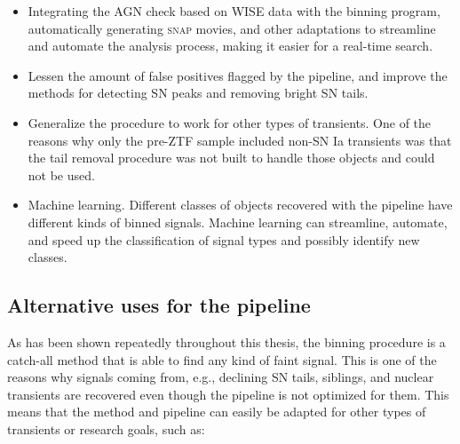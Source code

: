 \documentclass[a4paper,oneside,12pt, class=Latex/Classes/PhDthesisPSnPDF, crop=false]{standalone}
\begin{document}
\begin{itemize}
	\item Integrating the AGN check based on WISE data with the binning program, automatically generating \textsc{snap} movies, and other adaptations to streamline and automate the analysis process, making it easier for a real-time search.
	\item Lessen the amount of false positives flagged by the pipeline, and improve the methods for detecting SN peaks and removing bright SN tails.
	\item Generalize the procedure to work for other types of transients. One of the reasons why only the pre-ZTF sample included non-SN Ia transients was that the tail removal procedure was not built to handle those objects and could not be used.
	\item Machine learning. Different classes of objects recovered with the pipeline have different kinds of binned signals. Machine learning can streamline, automate, and speed up the classification of signal types and possibly identify new classes.
\end{itemize}


\subsection{Alternative uses for the pipeline}
As has been shown repeatedly throughout this thesis, the binning procedure is a catch-all method that is able to find any kind of faint signal. This is one of the reasons why signals coming from, e.g., declining SN tails, siblings, and nuclear transients are recovered even though the pipeline is not optimized for them. This means that the method and pipeline can easily be adapted for other types of transients or research goals, such as:
\end{document}
